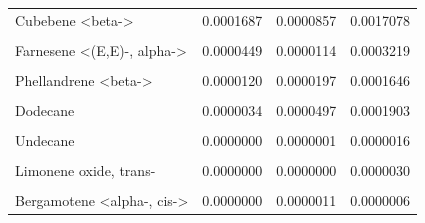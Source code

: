 \documentclass{ufdissertation}[overrideChapters] %
\begin{document}
{\begin{table}
{\begin{tabular}[t]{lrrr}
Cubebene <beta-> & 0.0001687 & 0.0000857 & 0.0017078\\
\cellcolor{gray!6}{Caryophyllene oxide} & \cellcolor{gray!6}{0.0000720} & \cellcolor{gray!6}{0.0000732} & \cellcolor{gray!6}{0.0017161}\\
Farnesene <(E,E)-, alpha-> & 0.0000449 & 0.0000114 & 0.0003219\\
\addlinespace
\cellcolor{gray!6}{Zonarene} & \cellcolor{gray!6}{0.0000171} & \cellcolor{gray!6}{0.0000013} & \cellcolor{gray!6}{0.0000096}\\
Phellandrene <beta-> & 0.0000120 & 0.0000197 & 0.0001646\\
\cellcolor{gray!6}{Pentadecane} & \cellcolor{gray!6}{0.0000089} & \cellcolor{gray!6}{0.0000522} & \cellcolor{gray!6}{0.0007362}\\
Dodecane & 0.0000034 & 0.0000497 & 0.0001903\\
\cellcolor{gray!6}{Hexadecane, 1-bromo-} & \cellcolor{gray!6}{0.0000002} & \cellcolor{gray!6}{0.0000026} & \cellcolor{gray!6}{0.0000055}\\
\addlinespace
Undecane & 0.0000000 & 0.0000001 & 0.0000016\\
\cellcolor{gray!6}{Benzaldehyde <para-ethyl->} & \cellcolor{gray!6}{0.0000000} & \cellcolor{gray!6}{0.0000001} & \cellcolor{gray!6}{0.0000001}\\
Limonene oxide, trans- & 0.0000000 & 0.0000000 & 0.0000030\\
\cellcolor{gray!6}{Terpineol <alpha->} & \cellcolor{gray!6}{0.0000000} & \cellcolor{gray!6}{0.0000000} & \cellcolor{gray!6}{0.0000013}\\
Bergamotene <alpha-, cis-> & 0.0000000 & 0.0000011 & 0.0000006\\
\bottomrule
\end{tabular}}
\end{table}
\begin{table}


\end{table}}
\end{document}
